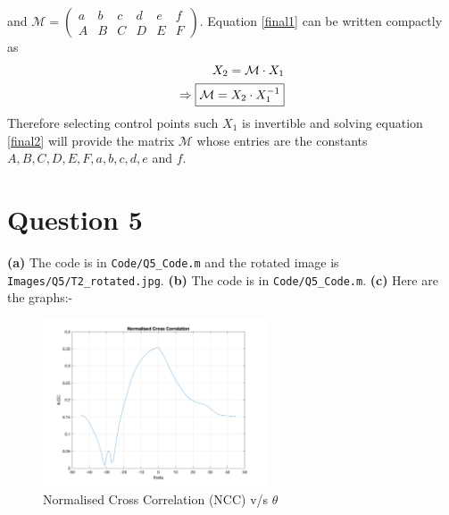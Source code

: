 \documentclass[12pt]{article}
\begin{document}
    and $\mathcal{M} = \begin{pmatrix}
        a & b & c & d & e & f \\
        A & B & C & D & E & F
    \end{pmatrix} $. Equation \ref{final1} can be written compactly as 
    \begin{align}
        X_{2} = \mathcal{M} \cdot X_{1} \nonumber \\
        \Rightarrow \boxed{\label{final2} \mathcal{M} = X_{2} \cdot X_{1}^{-1}} 
    \end{align}
    Therefore selecting control points such $X_{1}$ is invertible and solving equation \ref{final2} will provide the 
    matrix $\mathcal{M}$ whose entries are the constants $A,B,C,D,E,F,a,b,c,d,e$ and $f$.
    \clearpage
\section*{Question 5}
    \vspace{-10pt}
    
    \textbf{(a)} The code is in \verb|Code/Q5_Code.m| and the rotated image is \verb|Images/Q5/T2_rotated.jpg|. \newline
    \textbf{(b)} The code is in \verb|Code/Q5_Code.m|. \newline
    \textbf{(c)} Here are the graphs:-
    
    \vspace{-13pt}
    
    \begin{figure}[H]
        \centering
        \includegraphics[width=0.59\textwidth]{Images/Q5/NCC.png}
        \vspace{-10pt}
        \caption{Normalised Cross Correlation (NCC) v/s $\theta$}
    \end{figure}
    
    \vspace{-25pt}
    
\end{document}
